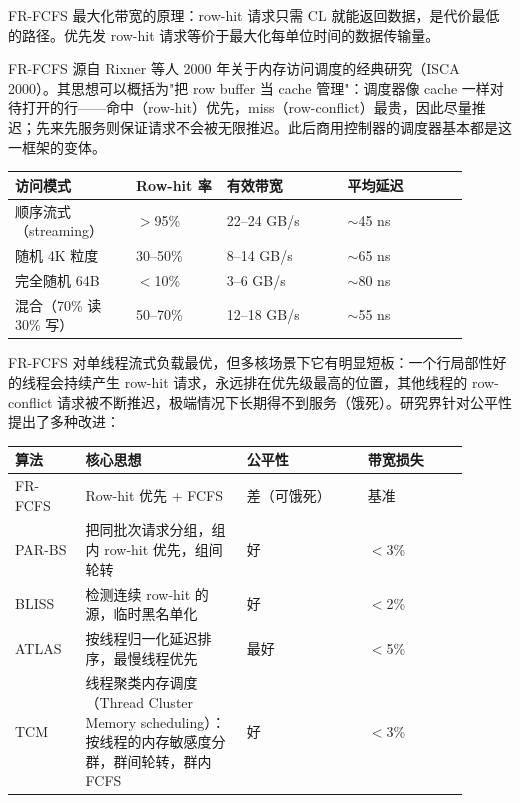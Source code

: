 FR-FCFS 最大化带宽的原理：row-hit 请求只需 CL 就能返回数据，是代价最低的路径。优先发 row-hit 请求等价于最大化每单位时间的数据传输量。

\begin{classicnote}
FR-FCFS 源自 Rixner 等人 2000 年关于内存访问调度的经典研究（ISCA 2000）。其思想可以概括为"把 row buffer 当 cache 管理"：调度器像 cache 一样对待打开的行——命中（row-hit）优先，miss（row-conflict）最贵，因此尽量推迟；先来先服务则保证请求不会被无限推迟。此后商用控制器的调度器基本都是这一框架的变体。
\end{classicnote}

\begin{longtable}{L{0.24\linewidth}L{0.18\linewidth}L{0.24\linewidth}L{0.24\linewidth}}
\toprule
访问模式 & Row-hit 率 & 有效带宽 & 平均延迟 \\
\midrule
顺序流式（streaming） & $>$95\% & 22--24 GB/s & $\sim$45 ns \\
随机 4K 粒度 & 30--50\% & 8--14 GB/s & $\sim$65 ns \\
完全随机 64B & $<$10\% & 3--6 GB/s & $\sim$80 ns \\
混合（70\% 读 30\% 写） & 50--70\% & 12--18 GB/s & $\sim$55 ns \\
\bottomrule
\end{longtable}



FR-FCFS 对单线程流式负载最优，但多核场景下它有明显短板：一个行局部性好的线程会持续产生 row-hit 请求，永远排在优先级最高的位置，其他线程的 row-conflict 请求被不断推迟，极端情况下长期得不到服务（饿死）。研究界针对公平性提出了多种改进：

\begin{longtable}{L{0.14\linewidth}L{0.32\linewidth}L{0.24\linewidth}L{0.2\linewidth}}
\toprule
算法 & 核心思想 & 公平性 & 带宽损失 \\
\midrule
FR-FCFS & Row-hit 优先 + FCFS & 差（可饿死） & 基准 \\
PAR-BS & 把同批次请求分组，组内 row-hit 优先，组间轮转 & 好 & $<$3\% \\
BLISS & 检测连续 row-hit 的源，临时黑名单化 & 好 & $<$2\% \\
ATLAS & 按线程归一化延迟排序，最慢线程优先 & 最好 & $<$5\% \\
TCM & 线程聚类内存调度（Thread Cluster Memory scheduling）：按线程的内存敏感度分群，群间轮转，群内 FCFS & 好 & $<$3\% \\
\bottomrule
\end{longtable}

